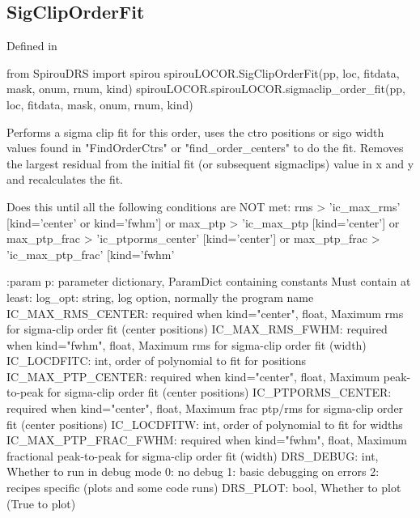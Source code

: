 \begin{minipage}{\textwidth}
\subsection{SigClipOrderFit}

Defined in \spirouLOCOR{}

\begin{pythonbox}
from SpirouDRS import spirou
spirouLOCOR.SigClipOrderFit(pp, loc, fitdata, mask, onum, rnum, kind)
spirouLOCOR.spirouLOCOR.sigmaclip_order_fit(pp, loc, fitdata, mask, onum, rnum, kind)
\end{pythonbox}

\begin{pythondocstring}
Performs a sigma clip fit for this order, uses the ctro positions or
sigo width values found in "FindOrderCtrs" or "find_order_centers" to do
the fit. Removes the largest residual from the initial fit (or subsequent
sigmaclips) value in x and y and recalculates the fit.

Does this until all the following conditions are NOT met:
       rms > 'ic_max_rms'   [kind='center' or kind='fwhm']
    or max_ptp > 'ic_max_ptp [kind='center']
    or max_ptp_frac > 'ic_ptporms_center'   [kind='center']
    or max_ptp_frac > 'ic_max_ptp_frac'     [kind='fwhm'

:param p: parameter dictionary, ParamDict containing constants
    Must contain at least:
            log_opt: string, log option, normally the program name
            IC_MAX_RMS_CENTER: required when kind="center", float, Maximum
                               rms for sigma-clip order fit (center
                               positions)
            IC_MAX_RMS_FWHM: required when kind="fwhm", float, Maximum
                             rms for sigma-clip order fit (width)
            IC_LOCDFITC: int, order of polynomial to fit for positions
            IC_MAX_PTP_CENTER: required when kind="center", float, Maximum
                               peak-to-peak for sigma-clip order fit
                               (center positions)
            IC_PTPORMS_CENTER: required when kind="center", float, Maximum
                               frac ptp/rms for sigma-clip order fit
                               (center positions)
            IC_LOCDFITW: int, order of polynomial to fit for widths
            IC_MAX_PTP_FRAC_FWHM: required when kind="fwhm", float, Maximum
                                  fractional peak-to-peak for sigma-clip
                                  order fit (width)
            DRS_DEBUG: int, Whether to run in debug mode
                            0: no debug
                            1: basic debugging on errors
                            2: recipes specific (plots and some code runs)
            DRS_PLOT: bool, Whether to plot (True to plot)


\end{pythondocstring}
\end{minipage}
